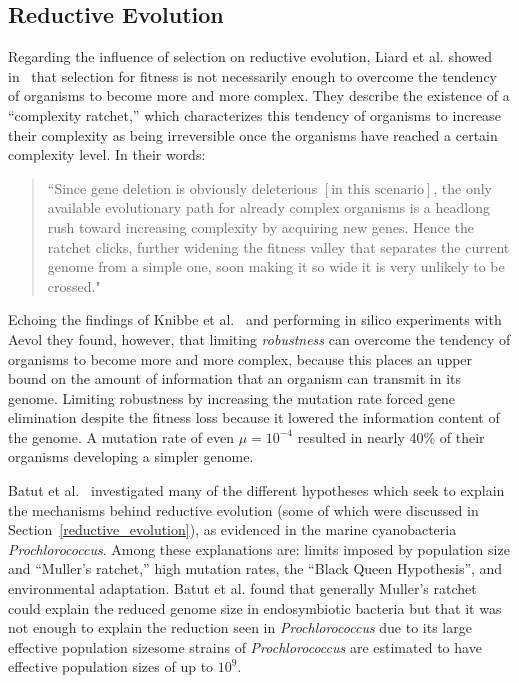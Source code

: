 \subsection{Reductive Evolution}\label{related_work:reductive_evolution}
Regarding the influence of selection on reductive evolution, Liard et al. showed in~\cite{Liard.2018} that selection for fitness is not necessarily enough to overcome the tendency of organisms to become more and more complex. They describe the existence of a ``complexity ratchet,'' which characterizes this tendency of organisms to increase their complexity as being irreversible once the organisms have reached a certain complexity level. In their words:
\begin{quote}
	``Since gene deletion is obviously deleterious $\left[\text{in this scenario}\right]$, the only available evolutionary path for already complex organisms is a headlong rush toward increasing complexity by acquiring new genes. Hence the ratchet clicks, further widening the fitness valley that separates the current genome from a simple one, soon making it so wide it is very unlikely to be crossed."
\end{quote} 
Echoing the findings of Knibbe et al.~\cite{Knibbe2007} and performing in silico experiments with Aevol they found, however, that limiting \textit{robustness} can overcome the tendency of organisms to become more and more complex, because this places an upper bound on the amount of information that an organism can transmit in its genome. Limiting robustness by increasing the mutation rate forced gene elimination despite the fitness loss because it lowered the information content of the genome. A mutation rate of even $\mu = 10^{-4}$ resulted in nearly 40\% of their organisms developing a simpler genome.

Batut et al.~\cite{Batut.2014} investigated many of the different hypotheses which seek to explain the mechanisms behind reductive evolution (some of which were discussed in Section~\ref{reductive_evolution}), as evidenced in the marine cyanobacteria \textit{Prochlorococcus}. Among these explanations are: limits imposed by population size and ``Muller's ratchet,'' high mutation rates, the ``Black Queen Hypothesis'', and environmental adaptation. Batut et al. found that generally Muller's ratchet could explain the reduced genome size in endosymbiotic bacteria but that it was not enough to explain the reduction seen in \textit{Prochlorococcus} due to its large effective population size\textemdash some strains of \textit{Prochlorococcus} are estimated to have effective population sizes of up to $10^9$.  

